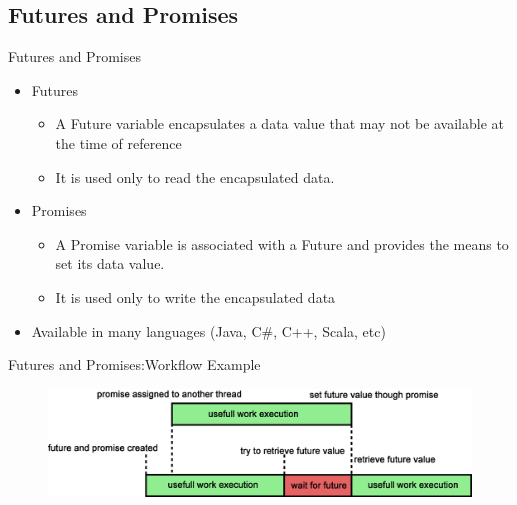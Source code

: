 \documentclass[svgnames]{beamer}
\begin{document}
\subsection{Futures and Promises}
\begin{frame}{Futures and Promises}
\begin{itemize}
	\item Futures
	\begin{itemize}
		\item A Future variable encapsulates a data value that may not be available at the time of reference
		\item It is used only to read the encapsulated data.
	\end{itemize}
	\item Promises
	\begin{itemize}
		\item A Promise variable is associated with a Future and provides the means to set its data value.
		\item It is used only to write the encapsulated data 
	\end{itemize}
\vfill
	\item Available in many languages (Java, C\#, C++, Scala, etc)
\end{itemize}
\end{frame}
\begin{frame}{Futures and Promises:Workflow Example}
\begin{figure}
\includegraphics[width=\columnwidth]{images/futures_blocking}
\end{figure}
\end{frame}
\end{document}
